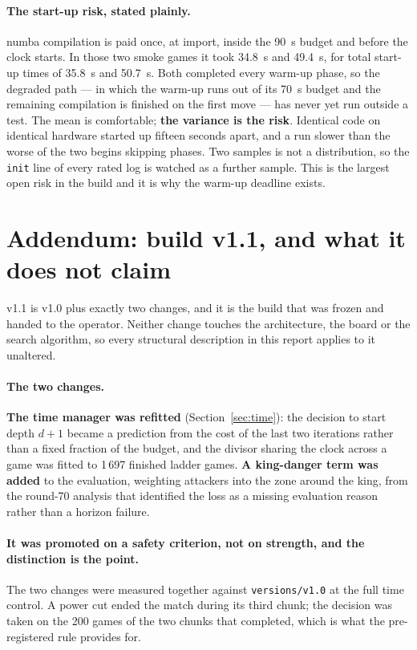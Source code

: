 \documentclass[11pt,a4paper]{article}
\newcommand{\code}[1]{\texttt{#1}}
\begin{document}
\paragraph{The start-up risk, stated plainly.} numba compilation is paid once, at import, inside the 90~s
budget and before the clock starts. In those two smoke games it took 34.8~s and 49.4~s, for total start-up
times of 35.8~s and 50.7~s. Both completed every warm-up phase, so the degraded path --- in which the
warm-up runs out of its 70~s budget and the remaining compilation is finished on the first move --- has
never yet run outside a test. The mean is comfortable; \textbf{the variance is the risk}. Identical code on
identical hardware started up fifteen seconds apart, and a run slower than the worse of the two begins
skipping phases. Two samples is not a distribution, so the \code{init} line of every rated log is watched
as a further sample. This is the largest open risk in the build and it is why the warm-up deadline exists.

\section*{Addendum: build v1.1, and what it does not claim}
v1.1 is v1.0 plus exactly two changes, and it is the build that was frozen and handed to the operator.
Neither change touches the architecture, the board or the search algorithm, so every structural
description in this report applies to it unaltered.

\paragraph{The two changes.} \textbf{The time manager was refitted} (Section~\ref{sec:time}): the
decision to start depth $d+1$ became a prediction from the cost of the last two iterations rather than
a fixed fraction of the budget, and the divisor sharing the clock across a game was fitted to 1\,697
finished ladder games. \textbf{A king-danger term was added} to the evaluation, weighting attackers
into the zone around the king, from the round-70 analysis that identified the loss as a missing
evaluation reason rather than a horizon failure.

\paragraph{It was promoted on a safety criterion, not on strength, and the distinction is the point.}
The two changes were measured together against \code{versions/v1.0} at the full time control. A power
cut ended the match during its third chunk; the decision was taken on the 200 games of the two chunks
that completed, which is what the pre-registered rule provides for.
\end{document}
